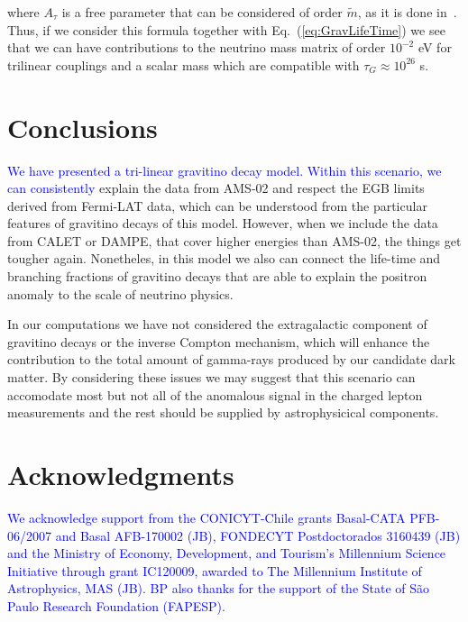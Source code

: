 \documentclass[a4paper,11pt]{article}
\newcommand*{\blue}{\textcolor{blue}}
\begin{document}
\noindent where $A_{\tau}$ is a free parameter that can be considered
of order $\tilde{m}$, as it is done in~\cite{Chun:2004mu}. Thus, if we
consider this formula together with Eq.~(\ref{eq:GravLifeTime}) we
see that we can have contributions to the neutrino mass matrix of
order $10^{-2}$ eV for trilinear couplings and a scalar mass
which are compatible with $\tau_{G}\approx10^{26}$ s.

\section{Conclusions}
\label{sec:conclusions}
\blue{We have presented a tri-linear gravitino decay model. Within this scenario, we can consistently} explain the data from AMS-02 and respect the EGB limits derived from Fermi-LAT data, which can be understood from the particular features of gravitino decays of this model. However, when we include the data from CALET or DAMPE, that cover higher energies than AMS-02, the things get tougher again. Nonetheles, in this model we also can connect the life-time and branching fractions of gravitino decays that are able to explain the positron anomaly to the scale of neutrino physics. 

In our computations we have not considered the extragalactic component of gravitino decays or the inverse Compton mechanism, which will enhance the contribution to the total amount of gamma-rays produced by our candidate dark matter. By considering these issues we may suggest that this scenario can accomodate most but not all of the anomalous signal in the charged lepton measurements and the rest should be supplied by astrophysicical components. 

\section*{Acknowledgments}

{\small 
\blue{We acknowledge support from the CONICYT-Chile grants Basal-CATA
PFB-06/2007 and Basal AFB-170002 (JB), FONDECYT Postdoctorados 3160439 (JB) and the Ministry of Economy, Development, and Tourism’s Millennium Science Initiative through grant IC120009, awarded to The Millennium Institute of Astrophysics, MAS (JB). BP also thanks for the support of the State of S\~{a}o Paulo Research Foundation (FAPESP).}


}
\end{document}
